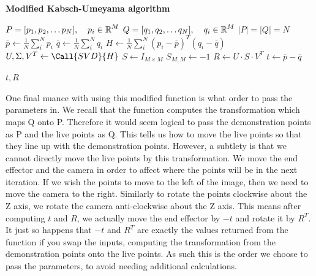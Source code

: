 \begin{algorithm}
    \setlength{\baselineskip}{18pt}
    \caption{\textbf{Modified Kabsch-Umeyama algorithm}}
    \label{alg:modified-kabsch}
    \begin{algorithmic}[1]
        \Require $P = [p_1, p_2, \dots p_N], \operatorname{\: \: \: \:} p_i \in \operatorname{\mathbb{R}}^M$
        \Statex $Q = [q_1, q_2, \dots q_N], \operatorname{\: \: \: \:} q_i \in \operatorname{\mathbb{R}}^M$
        \Ensure $|P| = |Q| = N$
            \State $\overline{p} \gets \frac{1}{N}\sum^N_{i} p_i$
            \State $\overline{q} \gets \frac{1}{N}\sum^N_{i} q_i$
            \State $H \gets \frac{1}{N}\sum^N_{i} (p_i - \overline{p})^T(q_i - \overline{q})$ 
            \State $U, \Sigma, V^T \gets \Call{SVD}{H}$ 
            \State $S \gets I_{M \times M}$ 
                \State $S_{M,M} \gets -1$                 
            \EndIf
            \State $R \gets U \cdot S \cdot V^T$
            \State $t \gets \overline{p} - \overline{q} $
    
            \State \Output $t, R$
        \EndProcedure
        
    \end{algorithmic}
\end{algorithm}

One final nuance with using this modified function is what order to pass the parameters in. We recall that the function computes the transformation which maps Q onto P. Therefore it would seem logical to pass the demonstration points as P and the live points as Q. This tells us how to move the live points so that they line up with the demonstration points. However, a subtlety is that we cannot directly move the live points by this transformation. We move the end effector and the camera in order to affect where the points will be in the next iteration. If we wish the points to move to the left of the image, then we need to move the camera to the right. Similarly to rotate the points clockwise about the Z axis, we rotate the camera anti-clockwise about the Z axis. This means after computing $t$ and $R$, we actually move the end effector by $-t$ and rotate it by $R^T$. It just so happens that $-t$ and $R^T$ are exactly the values returned from the function if you swap the inputs, computing the transformation from the demonstration points onto the live points. As such this is the order we choose to pass the parameters, to avoid needing additional calculations.

